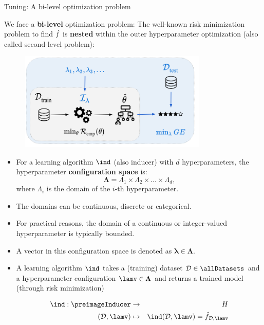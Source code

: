 \begin{vbframe}{Tuning: A bi-level optimization problem} 

\vspace{0.2cm} 

We face a \textbf{bi-level} optimization problem: The well-known risk minimization problem to find $\hat{f}$ is \textbf{nested} within the outer hyperparameter optimization (also called second-level problem):

\begin{center}
\begin{figure}
\includegraphics[width=0.8\textwidth]{figure_man/riskmin_bilevel3.png}
\end{figure}
\end{center}

\framebreak
  \footnotesize
  \begin{itemize}
    \item For a learning algorithm $\ind$ (also inducer) with $d$ hyperparameters, the hyperparameter \textbf{configuration space} is:
      $$\bm{\Lambda}=\Lambda_{1} \times \Lambda_{2} \times \ldots \times \Lambda_{d},$$
      where $\Lambda_{i}$ is the domain of the $i$-th hyperparameter.
    \item The domains can be continuous, discrete or categorical.
    \item For practical reasons, the domain of a continuous or integer-valued hyperparameter is typically bounded.
    \item A vector in this configuration space is denoted as $\bm{\lambda} \in \bm{\Lambda}$.
    \item A learning algorithm $\ind$ takes a (training) dataset $\D \in \allDatasets$ and a hyperparameter configuration $\lamv \in \bm{\Lambda}$ and returns a trained model (through risk minimization)

    \vspace*{-0.2cm}
  \begin{eqnarray*}
    \ind: \preimageInducer &\to& \Hspace \\
    (\D, \lamv) &\mapsto& \ind(\D, \lamv) = \hat f_{\D, \lamv}
  \end{eqnarray*}
  \end{itemize}


\end{vbframe}
